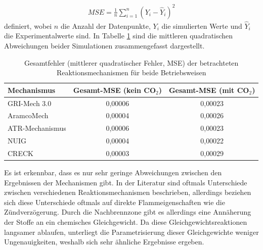         \begin{align}
            MSE = \frac{1}{n}\sum^n_{i=1}\left( Y_i - \hat{Y}_i\right)^2
            \label{eq:mse}
        \end{align}
        definiert, wobei $n$ die Anzahl der Datenpunkte, $Y_i$ die simulierten Werte und $\hat{Y}_i$ die Experimentalwerte sind. 
        In Tabelle \ref{tab:auswertung_mse_mechanismen} sind die mittleren quadratischen Abweichungen beider Simulationen zusammengefasst dargestellt.
        \begin{table}[H]
            \centering
            \caption{Gesamtfehler (mittlerer quadratischer Fehler, MSE) der betrachteten Reaktionsmechanismen für beide Betriebsweisen}
            \label{tab:auswertung_mse_mechanismen}
            \begin{tabular}{lcc}
                \toprule
                \textbf{Mechanismus} & \textbf{Gesamt-MSE (kein CO$_2$)} & \textbf{Gesamt-MSE (mit CO$_2$)} \\
                \midrule
                GRI-Mech 3.0   & 0{,}00006 & 0{,}00023 \\
                AramcoMech         & 0{,}00004 & 0{,}00026 \\
                ATR-Mechanismus & 0{,}00006 & 0{,}00023 \\
                NUIG           & 0{,}00004 & 0{,}00022 \\
                CRECK          & 0{,}00003 & 0{,}00029 \\
                \bottomrule
            \end{tabular}
        \end{table}
        Es ist erkennbar, dass es nur sehr geringe Abweichungen zwischen den Ergebnissen der Mechanismen gibt. In der Literatur sind oftmals Unterschiede zwischen verschiedenen Reaktionsmechanismen beschrieben, allerdings beziehen sich diese Unterschiede oftmals auf direkte Flammeigenschaften wie die Zündverzögerung. Durch die Nachbrennzone gibt es allerdings eine Annäherung der Stoffe an ein chemisches Gleichgewicht. Da diese Gleichgewichtsreaktionen langsamer ablaufen, unterliegt die Parametrisierung dieser Gleichgewichte weniger Ungenauigkeiten, weshalb sich sehr ähnliche Ergebnisse ergeben. 

